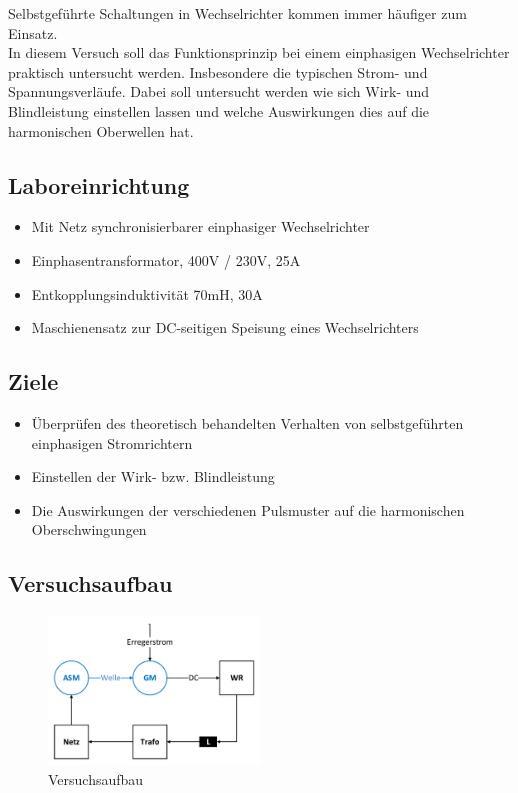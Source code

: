 Selbstgeführte Schaltungen in Wechselrichter kommen immer häufiger zum Einsatz.\\
In diesem Versuch soll das Funktionsprinzip bei einem einphasigen Wechselrichter praktisch untersucht werden. Insbesondere die typischen Strom- und Spannungsverläufe. Dabei soll untersucht werden wie sich Wirk- und Blindleistung einstellen lassen und welche Auswirkungen dies auf die harmonischen Oberwellen hat.


\subsection{Laboreinrichtung}
\begin{itemize}
\item Mit Netz synchronisierbarer einphasiger Wechselrichter
\item Einphasentransformator, 400V / 230V, 25A
\item Entkopplungsinduktivität 70mH, 30A
\item Maschienensatz zur DC-seitigen Speisung eines Wechselrichters
\end{itemize}

\subsection{Ziele}
\begin{itemize}
\item Überprüfen des theoretisch behandelten Verhalten von selbstgeführten einphasigen Stromrichtern
\item Einstellen der Wirk- bzw. Blindleistung
\item Die Auswirkungen der verschiedenen Pulsmuster auf die harmonischen Oberschwingungen
\end{itemize}

\subsection{Versuchsaufbau}
\begin{figure}[H]
  \begin{center}
  \includegraphics[width=0.5\textwidth]{pic/einleitung/versuchsaufbau.pdf}
  \caption{Versuchsaufbau}
  \label{fig:versuchsaufbau}
  \end{center}
\end{figure}

\clearpage